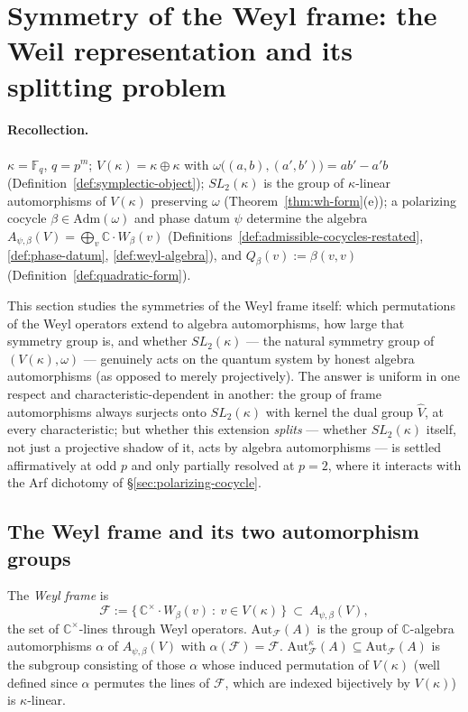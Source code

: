 \section{Symmetry of the Weyl frame: the Weil representation and its splitting problem}
\label{sec:weil}

\paragraph{Recollection.} $\kappa=\mathbb{F}_q$, $q=p^m$; $V(\kappa)=\kappa\oplus\kappa$
with $\omega\big((a,b),(a',b')\big)=ab'-a'b$ (Definition~\ref{def:symplectic-object});
$SL_2(\kappa)$ is the group of $\kappa$-linear automorphisms of $V(\kappa)$
preserving $\omega$ (Theorem~\ref{thm:wh-form}(e)); a polarizing cocycle
$\beta\in\mathrm{Adm}(\omega)$ and phase datum $\psi$ determine the algebra
$A_{\psi,\beta}(V)=\bigoplus_v\mathbb{C}\cdot W_\beta(v)$
(Definitions~\ref{def:admissible-cocycles-restated}, \ref{def:phase-datum},
\ref{def:weyl-algebra}), and $Q_\beta(v):=\beta(v,v)$
(Definition~\ref{def:quadratic-form}).

This section studies the symmetries of the Weyl frame itself: which
permutations of the Weyl operators extend to algebra automorphisms, how
large that symmetry group is, and whether $SL_2(\kappa)$ — the natural
symmetry group of $(V(\kappa),\omega)$ — genuinely acts on the quantum
system by honest algebra automorphisms (as opposed to merely projectively).
The answer is uniform in one respect and characteristic-dependent in
another: the group of frame automorphisms always surjects onto
$SL_2(\kappa)$ with kernel the dual group $\hat V$, at every characteristic;
but whether this extension \emph{splits} — whether $SL_2(\kappa)$ itself,
not just a projective shadow of it, acts by algebra automorphisms — is
settled affirmatively at odd $p$ and only partially resolved at $p=2$, where
it interacts with the Arf dichotomy of \S\ref{sec:polarizing-cocycle}.

\subsection{The Weyl frame and its two automorphism groups}

\begin{definition}
\label{def:weyl-frame}
The \emph{Weyl frame} is
\[
\mathcal{F} := \big\{\, \mathbb{C}^\times\cdot W_\beta(v) \ :\ v\in V(\kappa) \,\big\}
\ \subset\ A_{\psi,\beta}(V),
\]
the set of $\mathbb{C}^\times$-lines through Weyl operators. $\mathrm{Aut}_{\mathcal{F}}(A)$
is the group of $\mathbb{C}$-algebra automorphisms $\alpha$ of
$A_{\psi,\beta}(V)$ with $\alpha(\mathcal{F})=\mathcal{F}$.
$\mathrm{Aut}_{\mathcal{F}}^\kappa(A)\subseteq\mathrm{Aut}_{\mathcal{F}}(A)$ is
the subgroup consisting of those $\alpha$ whose induced permutation of
$V(\kappa)$ (well defined since $\alpha$ permutes the lines of $\mathcal{F}$,
which are indexed bijectively by $V(\kappa)$) is $\kappa$-linear.
\end{definition}

